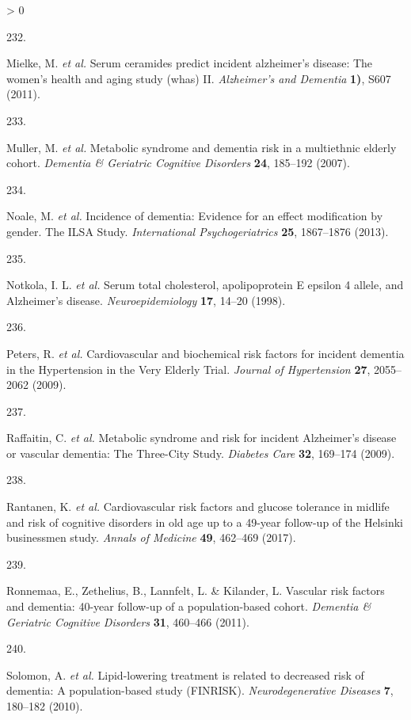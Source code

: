 \documentclass[a4paper, twoside]{templates/ociamthesis}
\newlength{\cslhangindent}
\newlength{\csllabelwidth}
\newenvironment{CSLReferences}[3] %
 {%
  \setlength{\parindent}{0pt}
  \ifodd #1 \everypar{\setlength{\hangindent}{\cslhangindent}}\ignorespaces\fi
  \ifnum #2 > 0
  \setlength{\parskip}{#2\baselineskip}
  \fi
 }%
 {}
\newcommand{\CSLLeftMargin}[1]{\parbox[t]{\maxof{\widthof{#1}}{\csllabelwidth}}{#1}}
\newcommand{\CSLRightInline}[1]{\parbox[t]{\linewidth - \csllabelwidth}{#1}}
\begin{document}
\begin{CSLReferences}{0}{0}
\leavevmode\hypertarget{ref-mielke2011}{}%
\CSLLeftMargin{232. }
\CSLRightInline{Mielke, M. \emph{et al.} Serum ceramides predict incident alzheimer's disease: The women's health and aging study (whas) {II}. \emph{Alzheimer's and Dementia} \textbf{1)}, S607 (2011).}

\leavevmode\hypertarget{ref-muller2007}{}%
\CSLLeftMargin{233. }
\CSLRightInline{Muller, M. \emph{et al.} Metabolic syndrome and dementia risk in a multiethnic elderly cohort. \emph{Dementia \& Geriatric Cognitive Disorders} \textbf{24}, 185--192 (2007).}

\leavevmode\hypertarget{ref-noale2013}{}%
\CSLLeftMargin{234. }
\CSLRightInline{Noale, M. \emph{et al.} Incidence of dementia: Evidence for an effect modification by gender. {The ILSA Study}. \emph{International Psychogeriatrics} \textbf{25}, 1867--1876 (2013).}

\leavevmode\hypertarget{ref-notkola1998}{}%
\CSLLeftMargin{235. }
\CSLRightInline{Notkola, I. L. \emph{et al.} Serum total cholesterol, apolipoprotein {E} epsilon 4 allele, and {Alzheimer}'s disease. \emph{Neuroepidemiology} \textbf{17}, 14--20 (1998).}

\leavevmode\hypertarget{ref-peters2009}{}%
\CSLLeftMargin{236. }
\CSLRightInline{Peters, R. \emph{et al.} Cardiovascular and biochemical risk factors for incident dementia in the {Hypertension} in the {Very Elderly Trial}. \emph{Journal of Hypertension} \textbf{27}, 2055--2062 (2009).}

\leavevmode\hypertarget{ref-raffaitin2009}{}%
\CSLLeftMargin{237. }
\CSLRightInline{Raffaitin, C. \emph{et al.} Metabolic syndrome and risk for incident {Alzheimer}'s disease or vascular dementia: The {Three}-{City Study}. \emph{Diabetes Care} \textbf{32}, 169--174 (2009).}

\leavevmode\hypertarget{ref-rantanen2017}{}%
\CSLLeftMargin{238. }
\CSLRightInline{Rantanen, K. \emph{et al.} Cardiovascular risk factors and glucose tolerance in midlife and risk of cognitive disorders in old age up to a 49-year follow-up of the {Helsinki} businessmen study. \emph{Annals of Medicine} \textbf{49}, 462--469 (2017).}

\leavevmode\hypertarget{ref-ronnemaa2011}{}%
\CSLLeftMargin{239. }
\CSLRightInline{Ronnemaa, E., Zethelius, B., Lannfelt, L. \& Kilander, L. Vascular risk factors and dementia: 40-year follow-up of a population-based cohort. \emph{Dementia \& Geriatric Cognitive Disorders} \textbf{31}, 460--466 (2011).}

\leavevmode\hypertarget{ref-solomon2010}{}%
\CSLLeftMargin{240. }
\CSLRightInline{Solomon, A. \emph{et al.} Lipid-lowering treatment is related to decreased risk of dementia: A population-based study ({FINRISK}). \emph{Neurodegenerative Diseases} \textbf{7}, 180--182 (2010).}


\end{CSLReferences}
\end{document}
